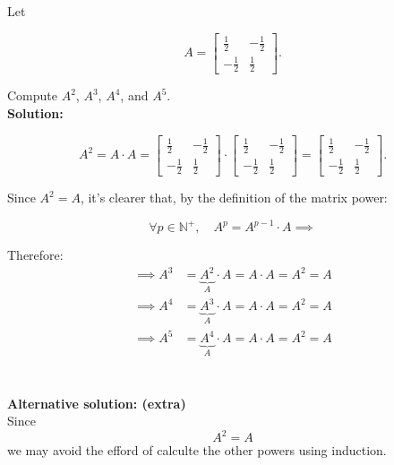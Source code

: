 
\item Let

$$
A = \begin{bmatrix}
    \frac{1}{2} & -\frac{1}{2} \\
    -\frac{1}{2} & \frac{1}{2}
\end{bmatrix}.
$$

Compute $A^2$, $A^3$, $A^4$, and $A^5$.\\

\textbf{Solution:}


\begin{answer}
    $$
        A^2 = A \cdot A = \begin{bmatrix}
            \frac{1}{2} & -\frac{1}{2} \\
            -\frac{1}{2} & \frac{1}{2}
        \end{bmatrix} \cdot \begin{bmatrix}
            \frac{1}{2} & -\frac{1}{2} \\
            -\frac{1}{2} & \frac{1}{2}
        \end{bmatrix} = \begin{bmatrix}
            \frac{1}{2} & -\frac{1}{2} \\
            -\frac{1}{2} & \frac{1}{2}
        \end{bmatrix}.
    $$

    Since $A^2=A$, it's clearer that, by the definition of the matrix power:

    $$
        \forall p \in \mathbb{N^+}, \quad A^p = A^{p-1} \cdot A \implies
    $$

    Therefore:
    $$\begin{aligned}
        \implies A^3 & = \underbrace{A^2}_{A} \cdot A = A \cdot A = A^2 = A \\
        \implies A^4 & = \underbrace{A^3}_{A} \cdot A = A \cdot A = A^2 = A \\
        \implies A^5 & = \underbrace{A^4}_{A} \cdot A = A \cdot A = A^2 = A \\
    \end{aligned}$$
\end{answer} \\

\textbf{Alternative solution: (extra)} \\[0.5em]
Since \\
$$
    \boxed{A^2 = A}
$$
we may avoid the efford of calculte the other powers using induction.\\

